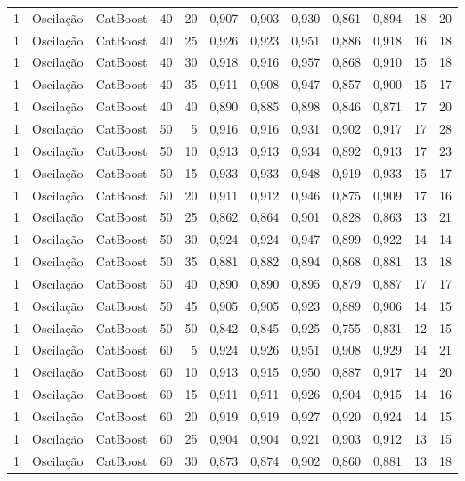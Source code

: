 \begin{longtable}{@{}rllrrrrrrrrr@{}}
1 & Oscilação & CatBoost & 40 & 20 & 0,907 & 0,903 & 0,930 & 0,861 & 0,894 & 18 & 20 \\
1 & Oscilação & CatBoost & 40 & 25 & 0,926 & 0,923 & 0,951 & 0,886 & 0,918 & 16 & 18 \\
1 & Oscilação & CatBoost & 40 & 30 & 0,918 & 0,916 & 0,957 & 0,868 & 0,910 & 15 & 18 \\
1 & Oscilação & CatBoost & 40 & 35 & 0,911 & 0,908 & 0,947 & 0,857 & 0,900 & 15 & 17 \\
1 & Oscilação & CatBoost & 40 & 40 & 0,890 & 0,885 & 0,898 & 0,846 & 0,871 & 17 & 20 \\
1 & Oscilação & CatBoost & 50 & 5 & 0,916 & 0,916 & 0,931 & 0,902 & 0,917 & 17 & 28 \\
1 & Oscilação & CatBoost & 50 & 10 & 0,913 & 0,913 & 0,934 & 0,892 & 0,913 & 17 & 23 \\
1 & Oscilação & CatBoost & 50 & 15 & 0,933 & 0,933 & 0,948 & 0,919 & 0,933 & 15 & 17 \\
1 & Oscilação & CatBoost & 50 & 20 & 0,911 & 0,912 & 0,946 & 0,875 & 0,909 & 17 & 16 \\
1 & Oscilação & CatBoost & 50 & 25 & 0,862 & 0,864 & 0,901 & 0,828 & 0,863 & 13 & 21 \\
1 & Oscilação & CatBoost & 50 & 30 & 0,924 & 0,924 & 0,947 & 0,899 & 0,922 & 14 & 14 \\
1 & Oscilação & CatBoost & 50 & 35 & 0,881 & 0,882 & 0,894 & 0,868 & 0,881 & 13 & 18 \\
1 & Oscilação & CatBoost & 50 & 40 & 0,890 & 0,890 & 0,895 & 0,879 & 0,887 & 17 & 17 \\
1 & Oscilação & CatBoost & 50 & 45 & 0,905 & 0,905 & 0,923 & 0,889 & 0,906 & 14 & 15 \\
1 & Oscilação & CatBoost & 50 & 50 & 0,842 & 0,845 & 0,925 & 0,755 & 0,831 & 12 & 15 \\
1 & Oscilação & CatBoost & 60 & 5 & 0,924 & 0,926 & 0,951 & 0,908 & 0,929 & 14 & 21 \\
1 & Oscilação & CatBoost & 60 & 10 & 0,913 & 0,915 & 0,950 & 0,887 & 0,917 & 14 & 20 \\
1 & Oscilação & CatBoost & 60 & 15 & 0,911 & 0,911 & 0,926 & 0,904 & 0,915 & 14 & 16 \\
1 & Oscilação & CatBoost & 60 & 20 & 0,919 & 0,919 & 0,927 & 0,920 & 0,924 & 14 & 15 \\
1 & Oscilação & CatBoost & 60 & 25 & 0,904 & 0,904 & 0,921 & 0,903 & 0,912 & 13 & 15 \\
1 & Oscilação & CatBoost & 60 & 30 & 0,873 & 0,874 & 0,902 & 0,860 & 0,881 & 13 & 18 \\

\end{longtable}
